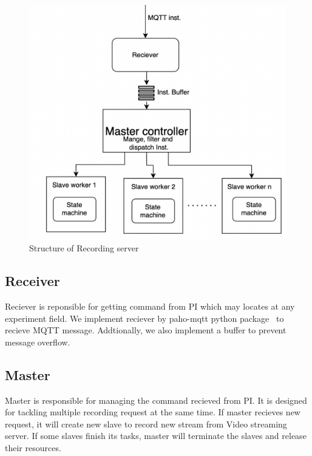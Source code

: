 \begin{figure}[H]
    \centering
    \includegraphics[width=\textwidth]{figsrc/recording-server-diagram.png}
    \caption{Structure of Recording server \label{fig:recording-server-diagram}}
\end{figure}

\subsection{Receiver}
Reciever is reponsible for getting command from PI which may locates at any experiment field. We implement reciever by paho-mqtt python package~\cite{paho-mqtt} to recieve MQTT message. Addtionally, we also implement a buffer to prevent message overflow.

\subsection{Master}
Master is responsible for managing the command recieved from PI. It is designed for tackling multiple recording request at the same time. If master recieves new request, it will create new slave to record new stream from Video streaming server. If some slaves finish its tasks, master will terminate the slaves and release their resources.

